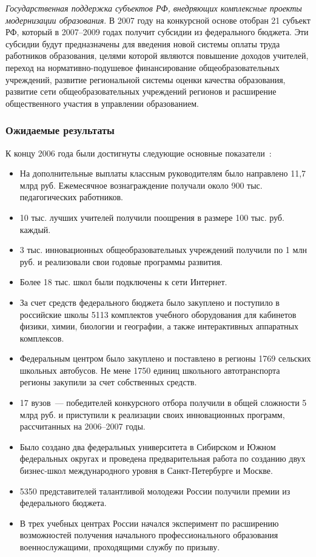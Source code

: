 \documentclass[article, 12pt, russian, oneside]{ncc}
\begin{document}
\emph{Государственная поддержка субъектов РФ, внедряющих комплексные
  проекты модернизации образования}. В 2007 году на конкурсной основе
отобран 21 субъект РФ, который в 2007--2009 годах получит субсидии из
федерального бюджета. Эти субсидии будут предназначены для введения
новой системы оплаты труда работников образования, целями которой
являются повышение доходов учителей, переход на нормативно-подушевое
финансирование общеобразовательных учреждений, развитие региональной
системы оценки качества образования, развитие сети общеобразовательных
учреждений регионов и расширение общественного участия в управлении
образованием.

\subsubsection{Ожидаемые результаты}

К концу 2006 года были достигнуты следующие основные
показатели~\cite{Edu_Waitings}:

\begin{itemize}
\item На дополнительные выплаты классным руководителям было направлено
  11,7 млрд руб. Ежемесячное вознаграждение получали около 900
  тыс. педагогических работников.
\item 10 тыс. лучших учителей получили поощрения в размере 100
  тыс. руб. каждый.
\item 3 тыс. инновационных общеобразовательных учреждений получили по
  1 млн руб. и реализовали свои годовые программы развития.
\item Более 18 тыс. школ были подключены к сети Интернет.
\item За счет средств федерального бюджета было закуплено и поступило
  в российские школы 5113 комплектов учебного оборудования для
  кабинетов физики, химии, биологии и географии, а также интерактивных
  аппаратных комплексов.
\item Федеральным центром было закуплено и поставлено в регионы 1769
  сельских школьных автобусов. Не мене 1750 единиц школьного
  автотранспорта регионы закупили за счет собственных средств.
\item 17 вузов~--- победителей конкурсного отбора получили в общей
  сложности 5 млрд руб. и приступили к реализации своих инновационных
  программ, рассчитанных на 2006--2007 годы.
\item Было создано два федеральных университета в Сибирском и Южном
  федеральных округах и проведена предварительная работа по созданию
  двух бизнес-школ международного уровня в Санкт-Петербурге и Москве.
\item 5350 представителей талантливой молодежи России получили премии
  из федерального бюджета.
\item В трех учебных центрах России начался эксперимент по расширению
  возможностей получения начального профессионального образования
  военнослужащими, проходящими службу по призыву.
\end{itemize}
\end{document}
